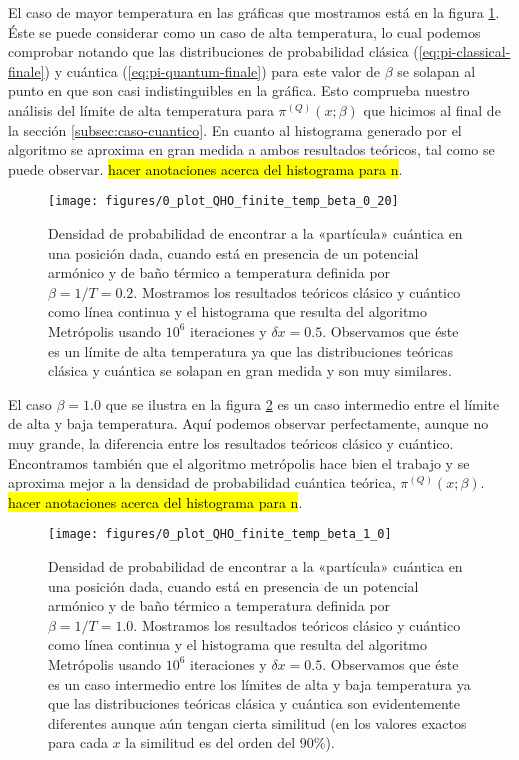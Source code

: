 \documentclass[%
 reprint,
 amsmath,amssymb,
 aps,
 pra,
]{revtex4-2}
\begin{document}
El caso de mayor temperatura en las gráficas que mostramos está en la figura \ref{fig:beta_0.2}. Éste se puede considerar como un caso de alta temperatura, lo cual podemos comprobar notando que las distribuciones de probabilidad clásica (\ref{eq:pi-classical-finale}) y cuántica (\ref{eq:pi-quantum-finale}) para este valor de $\beta$ se solapan al punto en que son casi indistinguibles en la gráfica. Esto comprueba nuestro análisis del límite de alta temperatura para $\pi^{(Q)}(x;\beta)$ que hicimos al final de la sección \ref{subsec:caso-cuantico}. En cuanto al histograma generado por el algoritmo se aproxima en gran medida a ambos resultados teóricos, tal como se puede observar. \hl{hacer anotaciones acerca del histograma para n}.

\begin{figure}[t]
	\centering
	\texttt{[image: figures/0\_plot\_QHO\_finite\_temp\_beta\_0\_20]}
	\caption{Densidad de probabilidad de encontrar a la «partícula» cuántica en una posición dada, cuando está en presencia de un potencial armónico y de baño térmico a temperatura definida por $\beta=1/T=0.2$. Mostramos los resultados teóricos clásico y cuántico como línea continua y el histograma que resulta del algoritmo Metrópolis usando $10^6$ iteraciones y $\delta x = 0.5$. Observamos que éste es un límite de alta temperatura ya que las distribuciones teóricas clásica y cuántica se solapan en gran medida y son muy similares.}
	\label{fig:beta_0.2}
\end{figure}

El caso $\beta=1.0$ que se ilustra en la figura \ref{fig:beta_1.0} es un caso intermedio entre el límite de alta y baja temperatura. Aquí podemos observar perfectamente, aunque no muy grande, la diferencia entre los resultados teóricos clásico y cuántico. Encontramos también que el algoritmo metrópolis hace bien el trabajo y se aproxima mejor a la densidad de probabilidad cuántica teórica, $\pi^{(Q)}(x;\beta)$. \hl{hacer anotaciones acerca del histograma para n}.

\begin{figure}[!b]
	\centering
	\texttt{[image: figures/0\_plot\_QHO\_finite\_temp\_beta\_1\_0]}
	\caption{Densidad de probabilidad de encontrar a la «partícula» cuántica en una posición dada, cuando está en presencia de un potencial armónico y de baño térmico a temperatura definida por $\beta=1/T=1.0$. Mostramos los resultados teóricos clásico y cuántico como línea continua y el histograma que resulta del algoritmo Metrópolis usando $10^6$ iteraciones y $\delta x = 0.5$. Observamos que éste es un caso intermedio entre los límites de alta y baja temperatura ya que las distribuciones teóricas clásica y cuántica son evidentemente diferentes aunque aún tengan cierta similitud (en los valores exactos para cada $x$ la similitud es del orden del $90\%$).}
	\label{fig:beta_1.0}
\end{figure}
\end{document}
